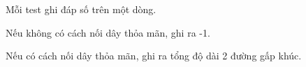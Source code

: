 Mỗi test ghi đáp số trên một dòng.

Nếu không có cách nối dây thỏa mãn, ghi ra -1.

Nếu có cách nối dây thỏa mãn, ghi ra tổng độ dài 2 đường gấp khúc.

\